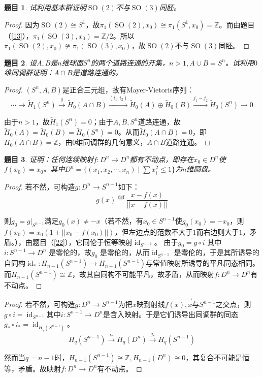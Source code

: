 \documentclass[UTF-8,11pt,fancyhdr,hyperref,titlepage]{ctexart}
\theoremstyle{question}
\newtheorem{timu}{题目}
\theoremstyle{theorem}
\theoremstyle{definition}
\theoremstyle{remark}
\def\ZZ{{\mathbb Z}}
\def\longto{\longrightarrow}
\def\To{\longto}
\newcommand{\local}[2]{\left.{#1}\right|_{#2}}
\newcommand{\defeq}{\stackrel{{\mathrm{def}}}{=}}
\newcommand{\markar}[1]{\stackrel{{#1}}{\longrightarrow}}%
\newcommand{\rH}[1]{\widetilde{H}_{#1}}
\DeclareMathOperator{\id}{id}
\DeclareMathOperator{\SO}{SO}
\begin{document}
\begin{timu}\label{17}
  试利用基本群证明$\SO(2)$不与$\SO(3)$同胚。
\end{timu}
\begin{proof}
  因为$\SO(2)\cong S^1$，故$\pi_1(\SO(2),x_0)\cong\pi_1(S^1,x_0)=\ZZ$。而由题目（\ref{13}），$\pi_1(\SO(3),x_0)=\ZZ/2$。所以$\pi_1(\SO(2),x_0)\ncong\pi_1(\SO(3),x_0)$，故$\SO(2)$不与$\SO(3)$同胚。
\end{proof}

\begin{timu}
  设$A,B$是$n$维球面$S^n$的两个道路连通的开集，$n>1,A\cup B=S^n$。试利用$0$维同调群证明：$A\cap B$是道路连通的。
\end{timu}
\begin{proof}
  $(S^n,A,B)$是正合三元组，故有Mayer-Vietoris序列：
  \begin{equation*}
    \cdots\To \rH{1}(S^n)\markar{\delta} \rH{0}(A\cap B)\markar{(i_1,i_2)} \rH{0}(A)\oplus \rH{0}(B) \markar{j_1-j_2} \rH{0}(S^n) \To 0
  \end{equation*}
  
  由于$n>1$，故$\rH{1}(S^n)=0$；由于$A,B,S^n$道路连通，故$\rH{0}(A)=\rH{0}(B)=\rH{0}(S^n)=0$。从而$\rH{0}(A\cap B)=0$，即$H_0(A\cap B)=\ZZ$，由$0$维同调群的几何意义，$A\cap B$道路连通。
\end{proof}

\begin{timu}\label{19}
  证明：任何连续映射$f\colon D^n\To D^n$都有不动点，即存在$x_0\in D^n$使$f(x_0)=x_0$。其中$D^n=\{(x_1,x_2,\cdots,x_n)\mid  \sum x_i^2\leqslant 1\}$为$n$维圆盘。
\end{timu}
\begin{proof}
  若不然，可构造$g\colon D^n\To S^{n-1}$如下：
  \begin{equation*}
    g(x)\defeq\frac{x-f(x)}{||x-f(x)||}
  \end{equation*}
  
  则$g_0=\local{g}{S^{n-1}}$满足$g_0(x)\neq-x$（若不然，有$x_0\in S^{n-1}$使$g_0(x_0)=-x_0$，则$f(x_0)=x_0(1+||x_0-f(x_0)||)$，但左边点的范数不大于$1$而右边则大于$1$，矛盾。），由题目（\ref{22}），它同伦于恒等映射$\id_{S^{n-1}}$。 由于$g_0=g\circ i$ 其中$i\colon S^{n-1}\To D^n$ 是零伦的，故$g_0$ 是零伦的，从而$\id_{S^{n-1}}$ 是零伦的，于是其所诱导的自同构$\id_{\ast}\colon H_{n-1}(S^{n-1})\To H_{n-1}(S^{n-1})$与常值映射所诱导的平凡同态相同。而$H_{n-1}(S^{n-1})\cong\ZZ$，故其自同构不可能平凡，故矛盾，从而映射$f\colon D^n\To D^n$有不动点。
\end{proof}
\begin{proof}
  若不然，可构造$g\colon D^n\To S^{n-1}$为把$x$映到射线$\overrightarrow{f(x),x}$与$S^{n-1}$之交点，则$g\circ i=\id_{S^{n-1}}$其中$i\colon S^{n-1}\To D^n$是含入映射。于是它们诱导出同调群的同态$g_{\ast}\circ i_{\ast}=\id_{H_q(S^{n-1})}$。
  \begin{equation*}
    H_q(S^{n-1}) \markar{i_{\ast}} H_q(D^n) \markar{g_{\ast}} H_q(S^{n-1})
  \end{equation*}
  
  然而当$q=n-1$时，$H_{n-1}(S^{n-1})\cong\ZZ, H_{n-1}(D^n)\cong 0$，其复合不可能是恒等，矛盾。故映射$f\colon D^n\To D^n$有不动点。
\end{proof}
\end{document}
